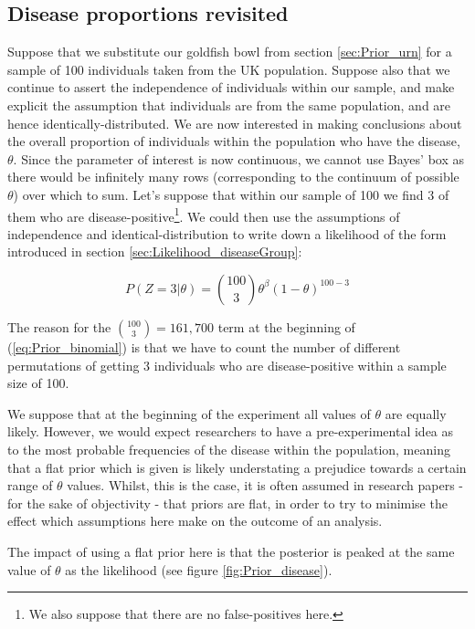 \documentclass[11pt,fullpage]{book}
\begin{document}
\subsection{Disease proportions revisited}\label{sec:Prior_diseaseProp}
Suppose that we substitute our goldfish bowl from section \ref{sec:Prior_urn} for a sample of 100 individuals taken from the UK population. Suppose also that we continue to assert the independence of individuals within our sample, and make explicit the assumption that individuals are from the same population, and are hence identically-distributed. We are now interested in making conclusions about the overall proportion of individuals within the population who have the disease, $\theta$. Since the parameter of interest is now continuous, we cannot use Bayes' box as there would be infinitely many rows (corresponding to the continuum of possible $\theta$) over which to sum. Let's suppose that within our sample of 100 we find 3 of them who are disease-positive\footnote{We also suppose that there are no false-positives here.}. We could then use the assumptions of independence and identical-distribution to write down a likelihood of the form introduced in section \ref{sec:Likelihood_diseaseGroup}:

\begin{equation}\label{eq:Prior_binomial}
P(Z=3|\theta) = {100 \choose 3} \theta^\beta (1-\theta)^{100-3}
\end{equation}

The reason for the ${100 \choose 3}=161,700$ term at the beginning of (\ref{eq:Prior_binomial}) is that we have to count the number of different permutations of getting 3 individuals who are disease-positive within a sample size of 100. 

We suppose that at the beginning of the experiment all values of $\theta$ are equally likely. However, we would expect researchers to have a pre-experimental idea as to the most probable frequencies of the disease within the population, meaning that a flat prior which is given is likely understating a prejudice towards a certain range of $\theta$ values. Whilst, this is the case, it is often assumed in research papers - for the sake of objectivity - that priors are flat, in order to try to minimise the effect which assumptions here make on the outcome of an analysis.

The impact of using a flat prior here is that the posterior is peaked at the same value of $\theta$ as the likelihood (see figure \ref{fig:Prior_disease}). 
\end{document}
